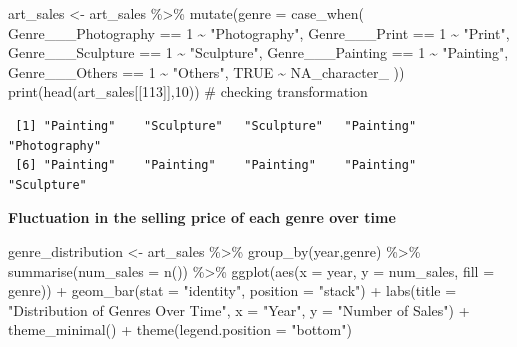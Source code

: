\documentclass[
  12pt,
]{article}
\newenvironment{Shaded}{\begin{snugshade}}{\end{snugshade}}
\newcommand{\AttributeTok}[1]{\textcolor[rgb]{0.40,0.45,0.13}{#1}}
\newcommand{\CommentTok}[1]{\textcolor[rgb]{0.37,0.37,0.37}{#1}}
\newcommand{\ConstantTok}[1]{\textcolor[rgb]{0.56,0.35,0.01}{#1}}
\newcommand{\DecValTok}[1]{\textcolor[rgb]{0.68,0.00,0.00}{#1}}
\newcommand{\FunctionTok}[1]{\textcolor[rgb]{0.28,0.35,0.67}{#1}}
\newcommand{\NormalTok}[1]{\textcolor[rgb]{0.00,0.23,0.31}{#1}}
\newcommand{\OtherTok}[1]{\textcolor[rgb]{0.00,0.23,0.31}{#1}}
\newcommand{\SpecialCharTok}[1]{\textcolor[rgb]{0.37,0.37,0.37}{#1}}
\newcommand{\StringTok}[1]{\textcolor[rgb]{0.13,0.47,0.30}{#1}}
\begin{document}
\begin{Shaded}
\begin{Highlighting}[]
\NormalTok{art\_sales }\OtherTok{\textless{}{-}}\NormalTok{ art\_sales }\SpecialCharTok{\%\textgreater{}\%}
  \FunctionTok{mutate}\NormalTok{(}\AttributeTok{genre =} \FunctionTok{case\_when}\NormalTok{(}
\NormalTok{    Genre\_\_\_Photography }\SpecialCharTok{==} \DecValTok{1} \SpecialCharTok{\textasciitilde{}} \StringTok{"Photography"}\NormalTok{,}
\NormalTok{    Genre\_\_\_Print }\SpecialCharTok{==} \DecValTok{1} \SpecialCharTok{\textasciitilde{}} \StringTok{"Print"}\NormalTok{,}
\NormalTok{    Genre\_\_\_Sculpture }\SpecialCharTok{==} \DecValTok{1} \SpecialCharTok{\textasciitilde{}} \StringTok{"Sculpture"}\NormalTok{,}
\NormalTok{    Genre\_\_\_Painting }\SpecialCharTok{==} \DecValTok{1} \SpecialCharTok{\textasciitilde{}} \StringTok{"Painting"}\NormalTok{,}
\NormalTok{    Genre\_\_\_Others }\SpecialCharTok{==} \DecValTok{1} \SpecialCharTok{\textasciitilde{}} \StringTok{"Others"}\NormalTok{,}
    \ConstantTok{TRUE} \SpecialCharTok{\textasciitilde{}} \ConstantTok{NA\_character\_}  
\NormalTok{  ))}
\FunctionTok{print}\NormalTok{(}\FunctionTok{head}\NormalTok{(art\_sales[[}\DecValTok{113}\NormalTok{]],}\DecValTok{10}\NormalTok{)) }\CommentTok{\# checking transformation }
\end{Highlighting}
\end{Shaded}

\begin{verbatim}
 [1] "Painting"    "Sculpture"   "Sculpture"   "Painting"    "Photography"
 [6] "Painting"    "Painting"    "Painting"    "Painting"    "Sculpture"  
\end{verbatim}

\textbf{Fluctuation in the selling price of each genre over time}

\begin{Shaded}
\begin{Highlighting}[]
\NormalTok{genre\_distribution }\OtherTok{\textless{}{-}}\NormalTok{ art\_sales }\SpecialCharTok{\%\textgreater{}\%}
  \FunctionTok{group\_by}\NormalTok{(year,genre) }\SpecialCharTok{\%\textgreater{}\%}
  \FunctionTok{summarise}\NormalTok{(}\AttributeTok{num\_sales =} \FunctionTok{n}\NormalTok{()) }\SpecialCharTok{\%\textgreater{}\%}
  \FunctionTok{ggplot}\NormalTok{(}\FunctionTok{aes}\NormalTok{(}\AttributeTok{x =}\NormalTok{ year, }\AttributeTok{y =}\NormalTok{ num\_sales, }\AttributeTok{fill =}\NormalTok{ genre)) }\SpecialCharTok{+}
  \FunctionTok{geom\_bar}\NormalTok{(}\AttributeTok{stat =} \StringTok{"identity"}\NormalTok{, }\AttributeTok{position =} \StringTok{"stack"}\NormalTok{) }\SpecialCharTok{+}
  \FunctionTok{labs}\NormalTok{(}\AttributeTok{title =} \StringTok{"Distribution of Genres Over Time"}\NormalTok{, }
       \AttributeTok{x =} \StringTok{"Year"}\NormalTok{, }\AttributeTok{y =} \StringTok{"Number of Sales"}\NormalTok{) }\SpecialCharTok{+}
  \FunctionTok{theme\_minimal}\NormalTok{() }\SpecialCharTok{+}
  \FunctionTok{theme}\NormalTok{(}\AttributeTok{legend.position =} \StringTok{"bottom"}\NormalTok{)}
\end{Highlighting}
\end{Shaded}
\end{document}
